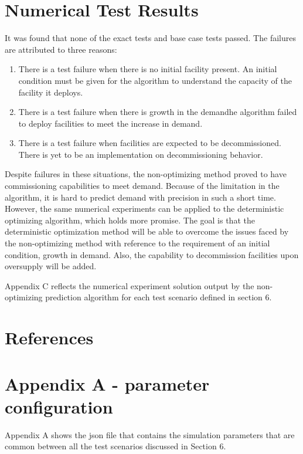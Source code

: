 \documentclass[11pt,letterpaper]{article}
\begin{document}
\section{Numerical Test Results}
It was found that none of the exact tests and base case tests passed. 
The failures are attributed to three reasons:

\begin{enumerate}
	\item There is a test failure when there is no initial facility present. An initial condition must be given for the algorithm to understand the capacity of the facility it deploys.
	\item There is a test failure when there is growth in the demandhe algorithm failed to deploy facilities to meet the increase in demand.
	\item There is a test failure when facilities are expected to be decommissioned. There is yet to be an implementation on decommissioning behavior.
\end{enumerate}

Despite failures in these situations, the non-optimizing method proved to have commissioning capabilities
to meet demand. Because of the limitation in the algorithm, it is hard to predict demand with precision
in such a short time. However, the same numerical experiments can be applied to the deterministic
optimizing algorithm, which holds more promise. The goal is that the deterministic optimization method
will be able to overcome the issues faced by the non-optimizing method with reference to the
requirement of an initial condition, growth in demand. Also, the capability to decommission facilities
upon oversupply will be added.

Appendix C reflects the numerical experiment solution output by the non-optimizing prediction algorithm for each test scenario defined in section 6. 

\pagebreak

\section{References}


\pagebreak

\section*{Appendix A - parameter configuration}
Appendix A shows the json file that contains the simulation parameters that are common between all the test scenarios discussed in Section 6.  
\end{document}
